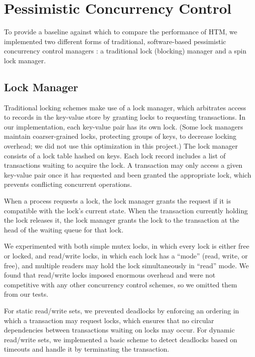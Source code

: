 \section{Pessimistic Concurrency Control} \label{sec:pessimistic}

To provide a baseline against which to compare the performance of HTM, we
implemented two different forms of traditional, software-based pessimistic
concurrency control managers : a traditional lock (blocking) manager 
and a spin lock manager.

\subsection{Lock Manager}

Traditional locking schemes make use of a lock manager, which arbitrates access
to records in the key-value store by granting locks to requesting transactions.
In our implementation, each key-value pair has its own lock. (Some lock managers
maintain coarser-grained locks, protecting groups of keys, to decrease locking
overhead; we did not use this optimization in this project.)
The lock manager consists of a lock table hashed on keys. Each lock record
includes a list of transactions waiting to acquire the lock. A transaction may
only access a given key-value pair once it has requested and been granted the
appropriate lock, which prevents conflicting concurrent operations.

When a process requests a lock, the lock manager grants the request if it is
compatible with the lock's current state. When the transaction currently holding
the lock releases it, the lock manager grants the lock to the transaction at the
head of the waiting queue for that lock.

We experimented with both simple mutex locks, in which every lock is either free
or locked, and read/write locks, in which each lock has a ``mode'' (read, write,
or free), and multiple readers may hold the lock simultaneously in ``read''
mode. We found that read/write locks imposed enormous overhead and were not
competitive with any other concurrency control schemes, so we omitted them from
our tests.

For static read/write sets, we prevented deadlocks by enforcing an ordering in
which a transaction may request locks, which ensures that no circular
dependencies between transactions waiting on locks may occur. For dynamic
read/write sets, we implemented a basic scheme to detect deadlocks
based on timeouts and handle it by terminating the transaction. \\

